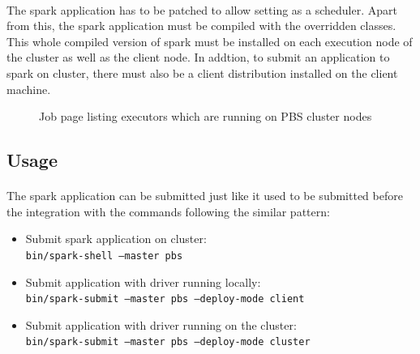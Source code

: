 \paragraph{}
The \gls{spark} application has to be patched to allow setting 
as a scheduler. Apart from this, the \gls{spark} application must be compiled
with the overridden classes. This whole compiled version of \gls{spark} must be
installed on each execution node of the cluster as well as the client node.
In addtion, to submit an application to \gls{spark} on  cluster,
there must also be a  client distribution installed on the client
machine.

\begin{figure}[h]
    \centering
    \caption{Job page listing executors which are running on PBS cluster nodes}
\end{figure}


\subsection{Usage}
\paragraph{}
The \gls{spark} application can be submitted just like it used to be submitted
before the  integration with the commands following the similar
pattern:

\begin{samepage}
    \begin{itemize}
        \item Submit \gls{spark} application on  cluster:\\
            \texttt{bin/spark-shell --master pbs}

        \item Submit application with \gls{driver} running locally:\\
            \texttt{bin/spark-submit --master pbs --deploy-mode client}

        \item Submit application with \gls{driver} running on the cluster:\\
            \texttt{bin/spark-submit --master pbs --deploy-mode cluster}
    \end{itemize}
\end{samepage}


